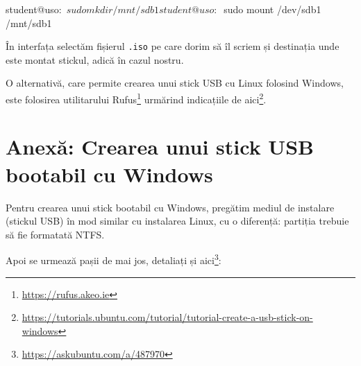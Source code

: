 \begin{screen}
student@uso:~$ sudo mkdir /mnt/sdb1
student@uso:~$ sudo mount /dev/sdb1 /mnt/sdb1
\end{screen}

În interfața  selectăm fișierul \texttt{.iso} pe care dorim să îl scriem și
destinația unde este montat stickul, adică  în cazul nostru.

O alternativă, care permite crearea unui stick USB cu Linux folosind Windows,
este folosirea utilitarului Rufus\footnote{\url{https://rufus.akeo.ie}} urmărind
indicațiile de
aici\footnote{\url{https://tutorials.ubuntu.com/tutorial/tutorial-create-a-usb-stick-on-windows}}.

\section{Anexă: Crearea unui stick USB bootabil cu Windows}
\label{sec:boot:usb-windows}

Pentru crearea unui stick bootabil cu Windows, pregătim mediul de instalare
(stickul USB) în mod similar cu instalarea Linux, cu o diferență: partiția
trebuie să fie formatată NTFS.

Apoi se urmează pașii de mai jos, detaliați și
aici\footnote{\url{https://askubuntu.com/a/487970}}:

